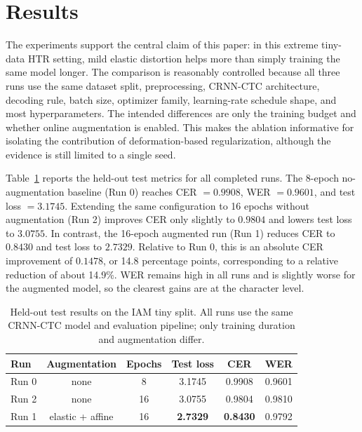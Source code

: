 \documentclass{article} %
\begin{document}
\section{Results}
\label{sec:results}

The experiments support the central claim of this paper: in this extreme tiny-data HTR setting, mild elastic distortion helps more than simply training the same model longer. The comparison is reasonably controlled because all three runs use the same dataset split, preprocessing, CRNN-CTC architecture, decoding rule, batch size, optimizer family, learning-rate schedule shape, and most hyperparameters. The intended differences are only the training budget and whether online augmentation is enabled. This makes the ablation informative for isolating the contribution of deformation-based regularization, although the evidence is still limited to a single seed.

Table~\ref{tab:main-results} reports the held-out test metrics for all completed runs. The 8-epoch no-augmentation baseline (Run 0) reaches CER \(= 0.9908\), WER \(= 0.9601\), and test loss \(= 3.1745\). Extending the same configuration to 16 epochs without augmentation (Run 2) improves CER only slightly to \(0.9804\) and lowers test loss to \(3.0755\). In contrast, the 16-epoch augmented run (Run 1) reduces CER to \(0.8430\) and test loss to \(2.7329\). Relative to Run 0, this is an absolute CER improvement of \(0.1478\), or 14.8 percentage points, corresponding to a relative reduction of about 14.9\%. WER remains high in all runs and is slightly worse for the augmented model, so the clearest gains are at the character level.

\begin{table}[t]
    \centering
    \caption{Held-out test results on the IAM tiny split. All runs use the same CRNN-CTC model and evaluation pipeline; only training duration and augmentation differ.}
    \label{tab:main-results}
    \begin{tabular}{lccccc}
        \toprule
        Run & Augmentation & Epochs & Test loss & CER & WER \\
        \midrule
        Run 0 & none & 8  & 3.1745 & 0.9908 & 0.9601 \\
        Run 2 & none & 16 & 3.0755 & 0.9804 & 0.9810 \\
        Run 1 & elastic + affine & 16 & \textbf{2.7329} & \textbf{0.8430} & 0.9792 \\
        \bottomrule
    \end{tabular}
\end{table}
\end{document}
